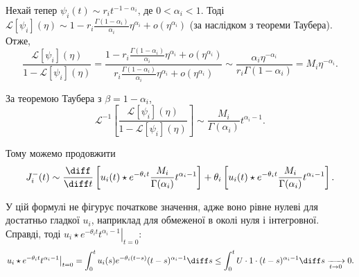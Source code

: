 Нехай тепер $\psi_i(t) \sim r_i t^{-1 - \alpha_i}$, де $0 < \alpha_i < 1$. Тоді $\mathcal{L}[\psi_i](\eta) \sim 1 - r_i \frac{\Gamma(1 - \alpha_i)}{\alpha_i} \eta^{\alpha_i} + o(\eta^{\alpha_i})$ (за наслідком з теореми Таубера). Отже,
\begin{equation}
    \frac{\mathcal{L}[\psi_i](\eta)}{1 - \mathcal{L}[\psi_i](\eta)} = \frac{1 - r_i \frac{\Gamma(1 - \alpha_i)}{\alpha_i} \eta^{\alpha_i} + o(\eta^{\alpha_i})}{r_i \frac{\Gamma(1 - \alpha_i)}{\alpha_i} \eta^{\alpha_i} + o(\eta^{\alpha_i})} \sim \frac{\alpha_i \eta^{-\alpha_i}}{r_i \Gamma(1 - \alpha_i)} = M_i \eta^{-\alpha_i}.
\end{equation}

За теоремою Таубера з $\beta = 1 - \alpha_i$,
\begin{equation}
    \mathcal{L}^{-1} \left[ \frac{\mathcal{L}[\psi_i](\eta)}{1 - \mathcal{L}[\psi_i](\eta)} \right] \sim \frac{M_i}{\Gamma(\alpha_i)} t^{\alpha_i - 1}.
\end{equation}

Тому можемо продовжити
\begin{equation}
    J_i^-(t) \sim \frac{\diff}{\diff t} \left[ u_i(t) \star e^{-\theta_i t} \frac{M_i}{\Gamma(\alpha_i)} t^{\alpha_i - 1} \right] + \theta_i \left[ u_i(t) \star e^{-\theta_i t} \frac{M_i}{\Gamma(\alpha_i)} t^{\alpha_i - 1} \right].
\end{equation}

\begin{remark}
    У цій формулі не фігурує початкове значення, адже воно рівне нулеві для достатньо гладкої $u_i$, наприклад для обмеженої в околі нуля і інтегровної. Справді, тоді $\left. u_i \star e^{-\theta_i t} t^{\alpha_i - 1} \right|_{t = 0}$:
    \begin{equation}
        \left. u_i \star e^{-\theta_i t} t^{\alpha_i - 1} \right|_{t = 0} = \int_0^t u_i(s) e^{-\theta_i (t - s)} (t - s)^{\alpha_i - 1} \diff s \le \int_0^t U \cdot 1 \cdot (t - s)^{\alpha_i - 1} \diff s \xrightarrow[t \to 0]{} 0.
    \end{equation}
\end{remark}

